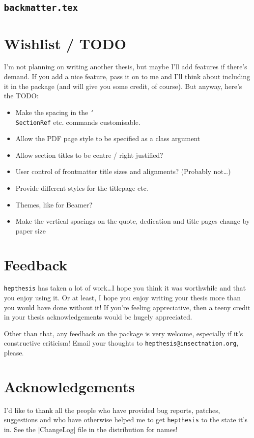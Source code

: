\documentclass[12pt]{scrartcl}
\newcommand{\hepthesis}{\texttt{hepthesis}\xspace}
\newcommand{\texcmd}[1]{\texorpdfstring{\texttt{\char`\\#1}}{#1}}
\begin{document}
\subsection{\texttt{backmatter.tex}}
{\smaller {}}


\section{Wishlist / TODO}
I'm not planning on writing another thesis, but maybe I'll add features if
there's demand. If you add a nice feature, pass it on to me and I'll think about
including it in the package (and will give you some credit, of course). But anyway,
here's the TODO:
%
\begin{itemize}
\item Make the spacing in the \texcmd{SectionRef} etc. commands customisable.
\item Allow the PDF page style to be specified as a class argument
\item Allow section titles to be centre / right justified?
\item User control of frontmatter title sizes and alignments? (Probably not\dots)
\item Provide different styles for the titlepage etc.
\item Themes, like for Beamer?
\item Make the vertical spacings on the quote, dedication and title pages change by paper size
\end{itemize}


\section{Feedback}
\hepthesis has taken a lot of work\dots I hope you think it was worthwhile and
that you enjoy using it. Or at least, I hope you enjoy writing your thesis more
than you would have done without it! If you're feeling appreciative, then a teeny
credit in your thesis acknowledgements would be hugely appreciated.

Other than that, any feedback on the package is very welcome, especially if it's
constructive criticism! Email your thoughts to
\texttt{hepthesis@insectnation.org}, please.


\section{Acknowledgements}
I'd like to thank all the people who have provided bug reports, patches, suggestions
and who have otherwise helped me to get \hepthesis to the state it's in. See the
|ChangeLog| file in the distribution for names!
\end{document}
